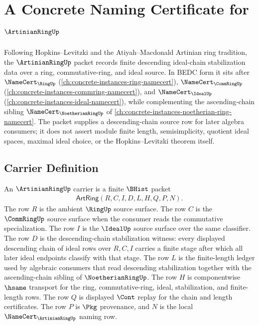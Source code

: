 \chapter{A Concrete Naming Certificate for $\ArtinianRingUp$}
\label{ch:concrete-instances-artinian-ring-namecert}

Following Hopkins--Levitzki and the Atiyah--Macdonald Artinian ring tradition, the $\ArtinianRingUp$ packet records finite descending ideal-chain stabilization data over a ring, commutative-ring, and ideal source. In BEDC form it sits after $\NameCert_{\RingUp}$ (\autoref{ch:concrete-instances-ring-namecert}), $\NameCert_{\CommRingUp}$ (\autoref{ch:concrete-instances-commring-namecert}), and $\NameCert_{\IdealUp}$ (\autoref{ch:concrete-instances-ideal-namecert}), while complementing the ascending-chain sibling $\NameCert_{\NoetherianRingUp}$ of \autoref{ch:concrete-instances-noetherian-ring-namecert}. The packet supplies a descending-chain source row for later algebra consumers; it does not assert module finite length, semisimplicity, quotient ideal spaces, maximal ideal choice, or the Hopkins--Levitzki theorem itself.

\section{Carrier Definition}
\label{sec:artinian-ring-carrier}

\begin{definition}\label{def:artinian-ring-carrier}
An $\ArtinianRingUp$ carrier is a finite $\BHist$ packet
$$
\begin{gathered}
\mathsf{ArtRing}(R,C,I,D,L,H,Q,P,N).
\end{gathered}
$$
The row $R$ is the ambient $\RingUp$ source surface. The row $C$ is the $\CommRingUp$ source surface when the consumer reads the commutative specialization. The row $I$ is the $\IdealUp$ source surface over the same classifier. The row $D$ is the descending-chain stabilization witness: every displayed descending chain of ideal rows over $R,C,I$ carries a finite stage after which all later ideal endpoints classify with that stage. The row $L$ is the finite-length ledger used by algebraic consumers that read descending stabilization together with the ascending-chain sibling of $\NoetherianRingUp$. The row $H$ is componentwise $\hsame$ transport for the ring, commutative-ring, ideal, stabilization, and finite-length rows. The row $Q$ is displayed $\Cont$ replay for the chain and length certificates. The row $P$ is $\Pkg$ provenance, and $N$ is the local $\NameCert_{\ArtinianRingUp}$ naming row.
\end{definition}


